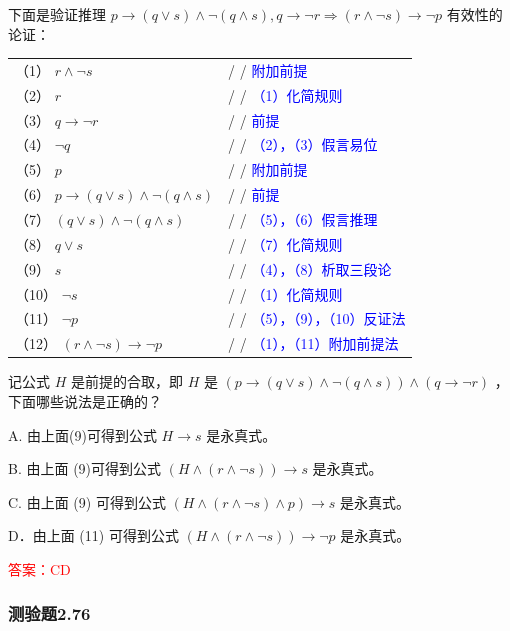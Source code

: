 \documentclass[UTF8, heading=true]{ctexart}
\begin{document}
下面是验证推理 $p \rightarrow(q \vee s) \wedge \neg(q \wedge s), q \rightarrow \neg r \Longrightarrow(r \wedge \neg s) \rightarrow \neg p$ 有效性的论证：
\begin{table}[htbp]
  \centering
  \renewcommand{\arraystretch}{1.5}
  \begin{tabular}{ll}
    （1）  $r \wedge \neg s$ & / / \textcolor{blue}{附加前提} \\
    （2）  $r$ & / / \textcolor{blue}{（1）化简规则} \\
    （3）  $q \rightarrow \neg r$ & / / \textcolor{blue}{前提} \\
    （4）  $\neg q$ & / / \textcolor{blue}{（2），（3）假言易位} \\
    （5）  $p$ & / / \textcolor{blue}{附加前提} \\
    （6）  $p \rightarrow(q \vee s) \wedge \neg(q \wedge s)$ & / / \textcolor{blue}{前提} \\
    （7）  $(q \vee s) \wedge \neg(q \wedge s)$ & / / \textcolor{blue}{（5），（6）假言推理} \\
    （8）  $q \vee s$ & / / \textcolor{blue}{（7）化简规则} \\
    （9）  $s$ & / / \textcolor{blue}{（4），（8）析取三段论} \\
    （10）  $\neg s$ & / / \textcolor{blue}{（1）化简规则} \\
    （11）  $\neg p$ & / / \textcolor{blue}{（5），（9），（10）反证法} \\
    （12）  $(r \wedge \neg s) \rightarrow \neg p$ & / / \textcolor{blue}{（1），（11）附加前提法} \\
  \end{tabular}
\end{table}

记公式 $H$ 是前提的合取，即 $H$ 是 $(p \rightarrow(q \vee s) \wedge \neg(q \wedge s)) \wedge(q \rightarrow \neg r)$ ，下面哪些说法是正确的？

A. 由上面(9)可得到公式 $H \rightarrow s$ 是永真式。

B. 由上面 (9)可得到公式 $(H \wedge(r \wedge \neg s)) \rightarrow s$ 是永真式。

C. 由上面 (9) 可得到公式 $(H \wedge(r \wedge \neg s) \wedge p) \rightarrow s$ 是永真式。

D．由上面 (11) 可得到公式 $(H \wedge(r \wedge \neg s)) \rightarrow \neg p$ 是永真式。


\textcolor{red}{答案：CD}



\subsubsection{测验题2.76}
\end{document}
